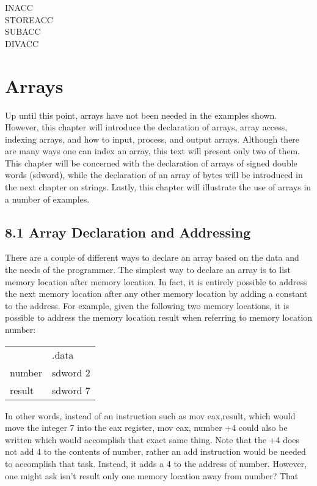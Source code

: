 \documentclass[10pt]{article}
\begin{document}
INACC\\
STOREACC\\
SUBACC\\
DIVACC

\section*{Arrays}
Up until this point, arrays have not been needed in the examples shown. However, this chapter will introduce the declaration of arrays, array access, indexing arrays, and how to input, process, and output arrays. Although there are many ways one can index an array, this text will present only two of them. This chapter will be concerned with the declaration of arrays of signed double words (sdword), while the declaration of an array of bytes will be introduced in the next chapter on strings. Lastly, this chapter will illustrate the use of arrays in a number of examples.

\subsection*{8.1 Array Declaration and Addressing}
There are a couple of different ways to declare an array based on the data and the needs of the programmer. The simplest way to declare an array is to list memory location after memory location. In fact, it is entirely possible to address the next memory location after any other memory location by adding a constant to the address. For example, given the following two memory locations, it is possible to address the memory location result when referring to memory location number:

\begin{center}
\begin{tabular}{ll}
 & .data \\
number & sdword 2 \\
result & sdword 7 \\
\end{tabular}
\end{center}

In other words, instead of an instruction such as mov eax,result, which would move the integer 7 into the eax register, mov eax, number +4 could also be written which would accomplish that exact same thing. Note that the +4 does not add 4 to the contents of number, rather an add instruction would be needed to accomplish that task. Instead, it adds a 4 to the address of number. However, one might ask isn't result only one memory location away from number? That
\end{document}
